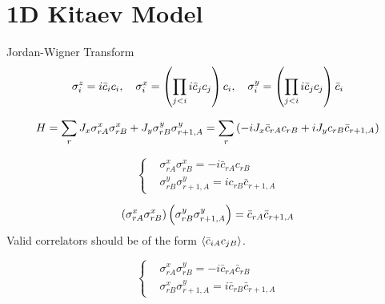 \section{1D Kitaev Model}
Jordan-Wigner Transform
\[
\sigma^z_i = i\bar{c}_i c_i
,\quad
\sigma^x_i = 
    \left( \prod_{j < i} i\bar{c}_j c_j \right) 
    c_i
,\quad
\sigma^y_i = 
    \left( \prod_{j < i} i\bar{c}_j c_j \right) 
    \bar{c}_i 
\]

\[
    H 
    = 
    \sum_{r}
    J_x\sigma^x_{rA}\sigma^x_{rB}
    +
    J_y\sigma^y_{rB}\sigma^y_{r+1,A} 
    =
    \sum_{r}
    \left( 
    -
    iJ_x \bar{c}_{rA} c_{rB}
    +
    iJ_y c_{rB} \bar{c}_{r+1, A}
     \right)   
\]

\[
\left\{
\begin{aligned}
    & \sigma^x_{rA}\sigma^x_{rB} = -i\bar{c}_{rA} c_{rB} \\
    & \sigma^y_{rB}\sigma^y_{r+1,A} = ic_{rB} \bar{c}_{r+1, A}
\end{aligned}
\right.
\]

\[
\left( \sigma^x_{rA}\sigma^x_{rB} \right)
\left( \sigma^y_{rB}\sigma^y_{r+1,A} \right)
=
\bar{c}_{rA} \bar{c}_{r+1, A}
\]
Valid correlators should be of the form $\langle \bar{c}_{i A} c_{j B} \rangle$.

\[
\left\{
\begin{aligned}
    & \sigma^x_{rA}\sigma^y_{rB} = -i\bar{c}_{rA} \bar{c}_{rB} \\
    & \sigma^x_{rB}\sigma^y_{r+1,A} = i\bar{c}_{rB} \bar{c}_{r+1, A}
\end{aligned}
\right.
\]

